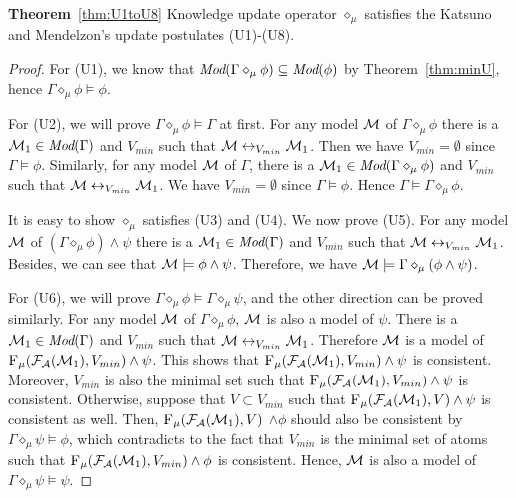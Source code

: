 \documentclass[runningheads]{llncs}
\begin{document}
 \noindent\textbf{Theorem}~\ref{thm:U1toU8}
 Knowledge update operator $\diamond_{\mu}$ satisfies the Katsuno and Mendelzon's update postulates (U1)-(U8).
 \begin{proof}
 For (U1), we know that $\textit{Mod}(\Gamma \diamond_{\mu} \phi) \subseteq \textit{Mod}(\phi)$ by Theorem~\ref{thm:minU}, hence $\Gamma \diamond_{\mu} \phi \models \phi$.

 For (U2), we will prove $\Gamma \diamond_{\mu} \phi \models \Gamma$ at first. For any model ${\cal M}$ of $\Gamma \diamond_{\mu} \phi$ there is a ${\cal M}_1 \in \textit{Mod}(\Gamma)$ and $V_{min}$ such that ${\cal M} \leftrightarrow_{V_{min}} {\cal M}_1$. Then we have $V_{min} = \emptyset$ since $\Gamma \models \phi$. Similarly, for any model ${\cal M}$ of $\Gamma$, there is a ${\cal M}_1\in \textit{Mod}(\Gamma \diamond_{\mu} \phi)$ and $V_{min}$ such that ${\cal M} \leftrightarrow_{V_{min}} {\cal M}_1$. We have $V_{min} = \emptyset$ since $\Gamma \models \phi$. Hence $\Gamma \models \Gamma \diamond_{\mu} \phi$.

 It is easy to show $\diamond_{\mu}$ satisfies (U3) and (U4). We now prove (U5). For any model ${\cal M}$ of $(\Gamma \diamond_{\mu} \phi) \wedge \psi$ there is a ${\cal M}_1 \in \textit{Mod}(\Gamma)$ and $V_{min}$ such that ${\cal M} \leftrightarrow_{V_{min}} {\cal M}_1$. Besides, we can see that ${\cal M} \models \phi \wedge \psi$. Therefore, we have ${\cal M} \models \Gamma \diamond_{\mu} (\phi \wedge \psi)$.

 For (U6), we will prove $\Gamma \diamond_{\mu} \phi \models \Gamma \diamond_{\mu} \psi$, and the other direction can be proved similarly. For any model ${\cal M}$ of $\Gamma \diamond_{\mu} \phi$, ${\cal M}$ is also a model of $\psi$. There is a ${\cal M}_1 \in \textit{Mod}(\Gamma)$ and $V_{min}$ such that ${\cal M} \leftrightarrow_{V_{min}} {\cal M}_1$. Therefore ${\cal M}$ is a model of ${\textsc{F}_{\textsc{$\mu$}}}({\cal F}_{{\cal A}}({\cal M}_1), V_{min}) \wedge \psi$. This shows that ${\textsc{F}_{\textsc{$\mu$}}}({\cal F}_{{\cal A}}({\cal M}_1), V_{min}) \wedge \psi$ is consistent. Moreover, $V_{min}$ is also the minimal set such that ${\textsc{F}_{\textsc{$\mu$}}}({\cal F}_{{\cal A}}({\cal M}_1), V_{min}) \wedge \psi$ is consistent. Otherwise, suppose that $V\subset V_{min}$ such that ${\textsc{F}_{\textsc{$\mu$}}}({\cal F}_{{\cal A}}({\cal M}_1), V) \wedge \psi$ is consistent as well. Then, ${\textsc{F}_{\textsc{$\mu$}}}({\cal F}_{{\cal A}}({\cal M}_1), V)$ $\wedge \phi$ should also be consistent by $\Gamma \diamond_{\mu} \psi \models \phi$, which contradicts to the fact that $V_{min}$ is the minimal set of atoms such that ${\textsc{F}_{\textsc{$\mu$}}}({\cal F}_{{\cal A}}({\cal M}_1), V_{min}) \wedge \phi$ is consistent. Hence, ${\cal M}$ is also a model of $\Gamma \diamond_{\mu} \psi \models \psi$.


\end{proof}
\end{document}
